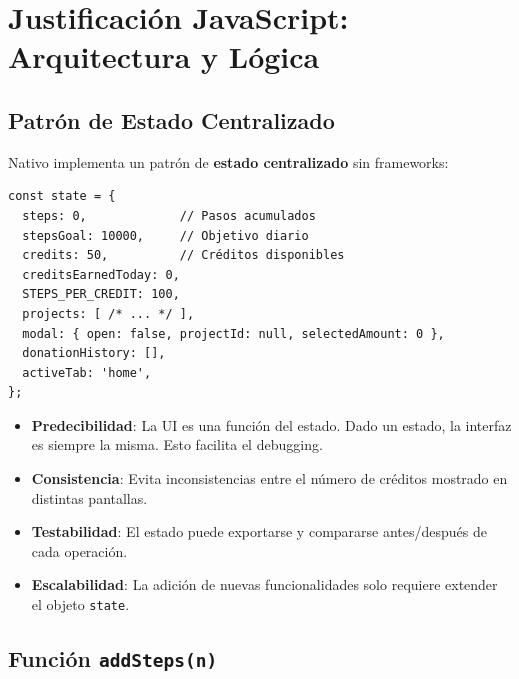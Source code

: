 \documentclass[12pt, a4paper]{article}
\begin{document}
\newpage
\section{Justificación JavaScript: Arquitectura y Lógica}

\subsection{Patrón de Estado Centralizado}

Nativo implementa un patrón de \textbf{estado centralizado} sin frameworks:

\begin{lstlisting}[style=javascript, caption={Estado centralizado de Nativo}]
const state = {
  steps: 0,             // Pasos acumulados
  stepsGoal: 10000,     // Objetivo diario
  credits: 50,          // Créditos disponibles
  creditsEarnedToday: 0,
  STEPS_PER_CREDIT: 100,
  projects: [ /* ... */ ],
  modal: { open: false, projectId: null, selectedAmount: 0 },
  donationHistory: [],
  activeTab: 'home',
};
\end{lstlisting}

\begin{justificacionbox}
\begin{itemize}
  \item \textbf{Predecibilidad}: La UI es una función del estado. Dado un estado, la interfaz es siempre la misma. Esto facilita el debugging.
  \item \textbf{Consistencia}: Evita inconsistencias entre el número de créditos mostrado en distintas pantallas.
  \item \textbf{Testabilidad}: El estado puede exportarse y compararse antes/después de cada operación.
  \item \textbf{Escalabilidad}: La adición de nuevas funcionalidades solo requiere extender el objeto \texttt{state}.
\end{itemize}
\end{justificacionbox}

\subsection{Función \texttt{addSteps(n)}}
\end{document}
